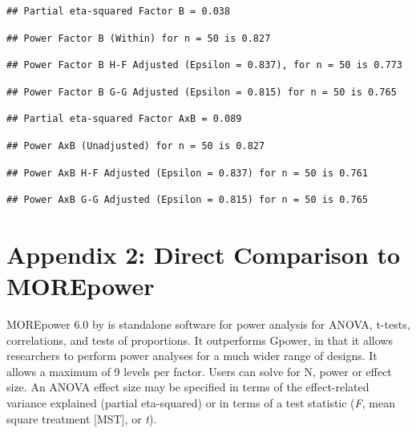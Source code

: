 \documentclass[
]{book}
\begin{document}
\begin{verbatim}
## Partial eta-squared Factor B = 0.038
\end{verbatim}

\begin{verbatim}
## Power Factor B (Within) for n = 50 is 0.827
\end{verbatim}

\begin{verbatim}
## Power Factor B H-F Adjusted (Epsilon = 0.837), for n = 50 is 0.773
\end{verbatim}

\begin{verbatim}
## Power Factor B G-G Adjusted (Epsilon = 0.815) for n = 50 is 0.765
\end{verbatim}

\begin{verbatim}
## Partial eta-squared Factor AxB = 0.089
\end{verbatim}

\begin{verbatim}
## Power AxB (Unadjusted) for n = 50 is 0.827
\end{verbatim}

\begin{verbatim}
## Power AxB H-F Adjusted (Epsilon = 0.837) for n = 50 is 0.761
\end{verbatim}

\begin{verbatim}
## Power AxB G-G Adjusted (Epsilon = 0.815) for n = 50 is 0.765
\end{verbatim}

\hypertarget{appendix-2-direct-comparison-to-morepower}{%
\chapter*{Appendix 2: Direct Comparison to MOREpower}\label{appendix-2-direct-comparison-to-morepower}}

MOREpower 6.0 by \citet{Campbell2012MorePower6F} is standalone software for power analysis for ANOVA, t-tests, correlations, and tests of proportions. It outperforms Gpower, in that it allows researchers to perform power analyses for a much wider range of designs. It allows a maximum of 9 levels per factor. Users can solve for N, power or effect size. An ANOVA effect size may be specified in terms of the effect-related variance explained (partial eta-squared) or in terms of a test statistic (\emph{F}, mean square treatment {[}MST{]}, or \emph{t}).
\end{document}
